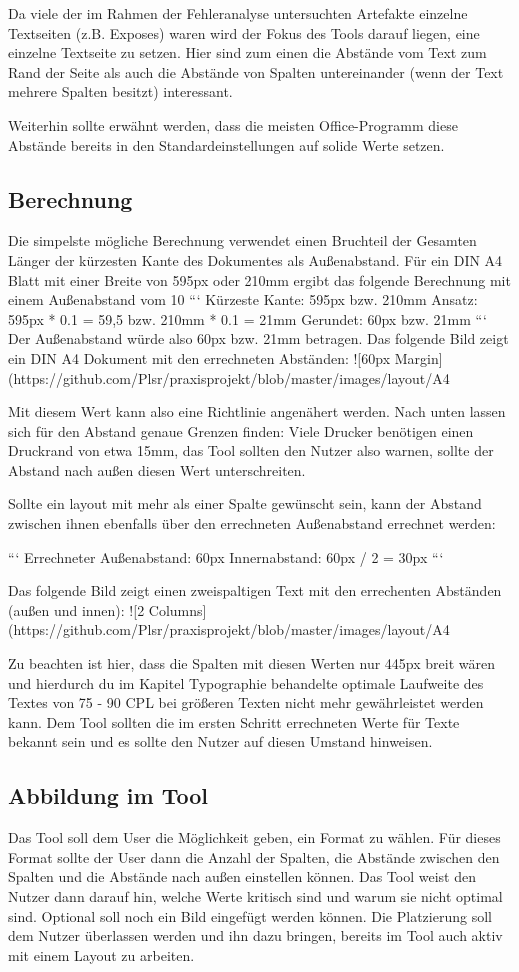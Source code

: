 Da viele der im Rahmen der Fehleranalyse untersuchten Artefakte einzelne Textseiten (z.B. Exposes) waren wird der Fokus des Tools darauf liegen, eine einzelne Textseite zu setzen.
Hier sind zum einen die Abstände vom Text zum Rand der Seite als auch die Abstände von Spalten untereinander (wenn der Text mehrere Spalten besitzt) interessant.

Weiterhin sollte erwähnt werden, dass die meisten Office-Programm diese Abstände bereits in den Standardeinstellungen auf   solide Werte setzen.

\subsection{Berechnung}
Die simpelste mögliche Berechnung verwendet einen Bruchteil der Gesamten Länger der kürzesten Kante des Dokumentes als Außenabstand. Für ein DIN A4 Blatt mit einer Breite von 595px oder 210mm ergibt das folgende Berechnung mit einem Außenabstand vom 10%
```
Kürzeste Kante: 595px bzw. 210mm
Ansatz: 595px * 0.1 = 59,5 bzw. 210mm * 0.1 = 21mm
Gerundet: 60px bzw. 21mm
```
Der Außenabstand würde also 60px bzw. 21mm betragen. Das folgende Bild zeigt ein DIN A4 Dokument mit den errechneten Abständen:
![60px Margin](https://github.com/Plsr/praxisprojekt/blob/master/images/layout/A4%

Mit diesem Wert kann also eine Richtlinie angenähert werden. Nach unten lassen sich für den Abstand genaue Grenzen finden: Viele Drucker benötigen einen Druckrand von etwa 15mm, das Tool sollten den Nutzer also warnen, sollte der Abstand nach außen diesen Wert unterschreiten.

Sollte ein layout mit mehr als einer Spalte gewünscht sein, kann der Abstand zwischen ihnen ebenfalls über den errechneten Außenabstand errechnet werden:

```
Errechneter Außenabstand: 60px
Innernabstand: 60px / 2 = 30px
```

Das folgende Bild zeigt einen zweispaltigen Text mit den errechenten Abständen (außen und innen):
![2 Columns](https://github.com/Plsr/praxisprojekt/blob/master/images/layout/A4%

Zu beachten ist hier, dass die Spalten mit diesen Werten nur 445px breit wären und hierdurch du im Kapitel Typographie behandelte optimale Laufweite des Textes von 75 - 90 CPL bei größeren Texten nicht mehr gewährleistet werden kann. Dem Tool sollten die im ersten Schritt errechneten Werte für Texte bekannt sein und es sollte den Nutzer auf diesen Umstand hinweisen.

\subsection{Abbildung im Tool}
Das Tool soll dem User die Möglichkeit geben, ein Format zu wählen. Für dieses Format sollte der User dann die Anzahl der Spalten, die Abstände zwischen den Spalten und die Abstände nach außen einstellen können.
Das Tool weist den Nutzer dann darauf hin, welche Werte kritisch sind und warum sie nicht optimal sind.
Optional soll noch ein Bild eingefügt werden können. Die Platzierung soll dem Nutzer überlassen werden und ihn dazu bringen, bereits im Tool auch aktiv mit einem Layout zu arbeiten.
